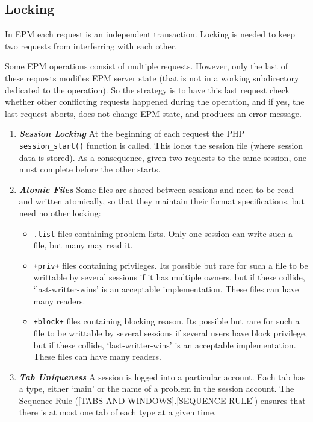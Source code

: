 \documentclass[12pt]{article}
\newcommand{\key}[1]{{\bf \em #1}}
\newcommand{\sref}[2]{(\ref{#1}.\ref{#2})}
\begin{document}
\subsection{Locking}

In EPM each request is an independent transaction.  Locking
is needed to keep two requests from interferring with each other.

Some EPM operations consist of multiple requests.  However,
only the last of these requests modifies EPM server state
(that is not in a working subdirectory dedicated to the operation).
So the strategy is to have this last request check whether
other conflicting requests happened during the operation, and
if yes, the last request aborts, does not change EPM state, and produces
an error message.

\begin{enumerate}

\item \key{Session Locking} At the beginning of each request
the PHP {\tt session\_start()} function is called.  This locks
the session file (where session data is stored).  As a consequence,
given two requests to the same session, one must complete before
the other starts.

\item \key{Atomic Files}
Some files are shared between sessions and need to be
read and written atomically, so that they maintain their
format specifications, but need no other locking:
\begin{itemize}
\item {\tt .list} files containing problem lists.  Only one
session can write such a file, but many may read it.
\item {\tt +priv+} files containing privileges.  Its possible
but rare for such a file to be writtable by several sessions if it has
multiple owners, but if these collide, `last-writter-wins' is
an acceptable implementation.  These files can have many readers.
\item {\tt +block+} files containing blocking reason.  Its possible
but rare for such a file to be writtable by several sessions if several
users have block privilege, but if these collide, `last-writter-wins' is
an acceptable implementation.  These files can have many readers.
\end{itemize}

\item \key{Tab Uniqueness}
A session is logged into a particular
account.  Each tab has a type, either `main'
or the name of a problem in the session account.
The Sequence Rule \sref{TABS-AND-WINDOWS}{SEQUENCE-RULE}
ensures that there is at most one tab of each type at a given
time.


\end{enumerate}
\end{document}
